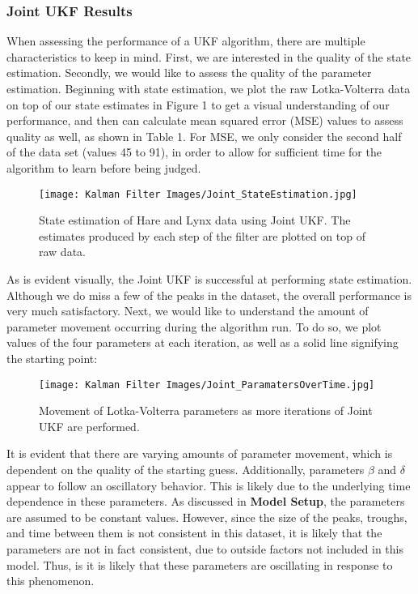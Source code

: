 \subsubsection{Joint UKF Results}
When assessing the performance of a UKF algorithm, there are multiple characteristics to keep in mind. First, we are interested in the quality of the state estimation. Secondly, we would like to assess the quality of the parameter estimation. Beginning with state estimation, we plot the raw Lotka-Volterra data on top of our state estimates in Figure 1 to get a visual understanding of our performance, and then can calculate mean squared error (MSE) values to assess quality as well, as shown in Table 1. For MSE, we only consider the second half of the data set (values 45 to 91), in order to allow for sufficient time for the algorithm to learn before being judged.\\ 


\begin{figure}[H]
    \centering
    \texttt{[image: Kalman Filter Images/Joint\_StateEstimation.jpg]}
    \caption{State estimation of Hare and Lynx data using Joint UKF. The estimates produced by each step of the filter are plotted on top of raw data.}
\end{figure}


As is evident visually, the Joint UKF is successful at performing state estimation. Although we do miss a few of the peaks in the dataset, the overall performance is very much satisfactory. Next, we would like to understand the amount of parameter movement occurring during the algorithm run. To do so, we plot values of the four parameters at each iteration, as well as a solid line signifying the starting point:\\

\begin{figure}[H]
    \centering
    \texttt{[image: Kalman Filter Images/Joint\_ParamatersOverTime.jpg]}
    \caption{Movement of Lotka-Volterra parameters as more iterations of Joint UKF are performed.}
\end{figure}


It is evident that there are varying amounts of parameter movement, which is dependent on the quality of the starting guess. Additionally, parameters $\beta$ and $\delta$ appear to follow an oscillatory behavior. This is likely due to the underlying time dependence in these parameters. As discussed in \textbf{Model Setup}, the parameters are assumed to be constant values. However, since the size of the peaks, troughs, and time between them is not consistent in this dataset, it is likely that the parameters are not in fact consistent, due to outside factors not included in this model. Thus, is it is likely that these parameters are oscillating in response to this phenomenon.\\
\\

